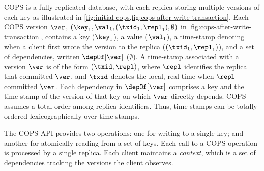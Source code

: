 

COPS is a fully replicated database, with each replica storing multiple versions of each key as illustrated in \cref{fig:initial-cops,fig:cops-after-write-transaction}. 
Each COPS version \( \ver \),
\eg \( (\key_1,\val_1,(\txid_1,\repl_1), \emptyset) \) in \cref{fig:cops-after-write-transaction},
contains a key (\eg $\key_1$), a value (\eg $\val_1$), a time-stamp denoting when a client first wrote the version to the replica (\eg $(\txid_1, \repl_1)$), and a set of dependencies, written $\depOf[\ver]$ (\eg $\emptyset$). 
A time-stamp associated with a version $\ver$ is of the form $(\txid, \repl)$, where $\repl$ identifies the replica that committed $\ver$, and $\txid$ denotes the local, real time when $\repl$ committed $\ver$. 
Each dependency in $\depOf[\ver]$ comprises a key and the time-stamp of the version of that key on which $\ver$ directly depends.  
COPS assumes a total order among replica identifiers. Thus,  time-stamps can be
totally ordered lexicographically over time-stamps. 

The COPS API provides two operations: one for writing to a single
key; and another for atomically reading from a set of keys. 
Each call to a COPS operation is processed by a single replica. 
Each client maintains a \emph{context}, which is a set of dependencies
tracking the versions the client observes.  

